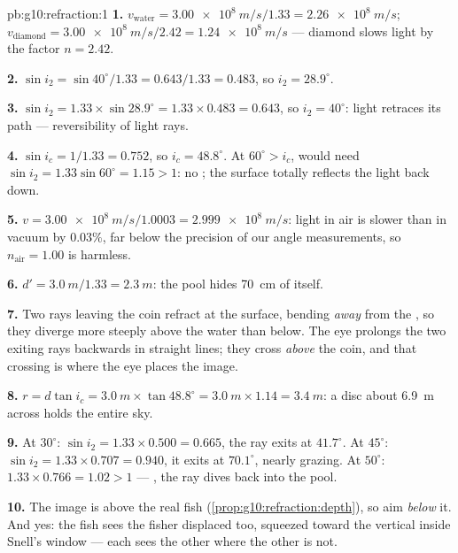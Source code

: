 \begin{solution}{pb:g10:refraction:1}
\textbf{1.} $v_{\text{water}} = \qty{3.00e8}{m/s}/1.33 =
\qty{2.26e8}{m/s}$; $v_{\text{diamond}} = \qty{3.00e8}{m/s}/2.42 =
\qty{1.24e8}{m/s}$ --- diamond slows light by the factor $n = 2.42$.

\textbf{2.} $\sin i_2 = \sin 40^\circ / 1.33 = 0.643/1.33 = 0.483$, so
$i_2 = 28.9^\circ$.

\textbf{3.} $\sin i_2 = 1.33 \times \sin 28.9^\circ = 1.33 \times
0.483 = 0.643$, so $i_2 = 40^\circ$: light retraces its path ---
reversibility of light rays.

\textbf{4.} $\sin i_c = 1/1.33 = 0.752$, so $i_c = 48.8^\circ$. At
$60^\circ > i_c$,  would need $\sin i_2 = 1.33 \sin
60^\circ = 1.15 > 1$: no ; the surface totally reflects
the light back down.

\textbf{5.} $v = \qty{3.00e8}{m/s}/1.0003 = \qty{2.999e8}{m/s}$: light
in air is slower than in vacuum by $0.03\%$, far below the precision of
our angle measurements, so $n_{\text{air}} = 1.00$ is harmless.

\textbf{6.} $d' = \qty{3.0}{m}/1.33 = \qty{2.3}{m}$: the pool hides
\qty{70}{cm} of itself.

\textbf{7.} Two rays leaving the coin refract at the surface, bending
\emph{away} from the , so they diverge more steeply above the
water than below. The eye prolongs the two exiting rays backwards in
straight lines; they cross \emph{above} the coin, and that crossing is
where the eye places the image.

\textbf{8.} $r = d \tan i_c = \qty{3.0}{m} \times \tan 48.8^\circ =
\qty{3.0}{m} \times 1.14 = \qty{3.4}{m}$: a disc about \qty{6.9}{m}
across holds the entire sky.

\textbf{9.} At $30^\circ$: $\sin i_2 = 1.33 \times 0.500 = 0.665$, the
ray exits at $41.7^\circ$. At $45^\circ$: $\sin i_2 = 1.33 \times
0.707 = 0.940$, it exits at $70.1^\circ$, nearly grazing. At
$50^\circ$: $1.33 \times 0.766 = 1.02 > 1$ --- , the ray dives back into the pool.

\textbf{10.} The image is above the real fish
(\cref{prop:g10:refraction:depth}), so aim \emph{below} it. And yes:
the fish sees the fisher displaced too, squeezed toward the vertical
inside Snell's window --- each sees the other where the other is not.


\end{solution}
